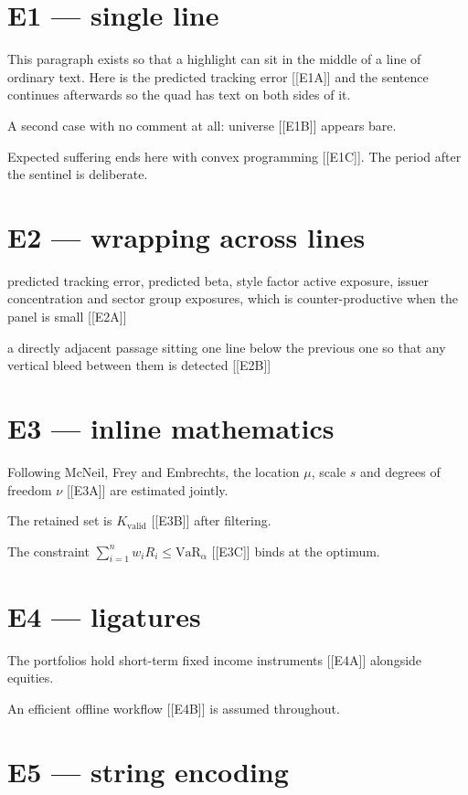 \documentclass[11pt,a4paper]{article}
\begin{document}
\section*{E1 --- single line}

This paragraph exists so that a highlight can sit in the middle of a
line of ordinary text. Here is the predicted tracking error [[E1A]] and
the sentence continues afterwards so the quad has text on both sides of
it.

A second case with no comment at all: universe [[E1B]] appears bare.

Expected suffering ends here with convex programming [[E1C]]. The period
after the sentinel is deliberate.

\section*{E2 --- wrapping across lines}

\parbox{0.46\textwidth}{%
predicted tracking error, predicted beta, style factor active exposure,
issuer concentration and sector group exposures, which is
counter-productive when the panel is small [[E2A]]%
}

\parbox{0.46\textwidth}{%
a directly adjacent passage sitting one line below the previous one so
that any vertical bleed between them is detected [[E2B]]%
}

\section*{E3 --- inline mathematics}

Following McNeil, Frey and Embrechts, the location $\mu$, scale $s$ and
degrees of freedom $\nu$ [[E3A]] are estimated jointly.

The retained set is $K_{\text{valid}}$ [[E3B]] after filtering.

The constraint $\sum_{i=1}^{n} w_i R_i \le \mathrm{VaR}_\alpha$ [[E3C]]
binds at the optimum.

\section*{E4 --- ligatures}

The portfolios hold short-term fixed income instruments [[E4A]]
alongside equities.

An efficient offline workflow [[E4B]] is assumed throughout.

\section*{E5 --- string encoding}
\end{document}
